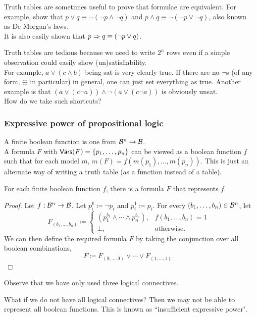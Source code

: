 Truth tables are sometimes useful to prove that formulae are equivalent. For example, show that $p\vee q \equiv \neg(\neg p \wedge \neg q)$ and $p\wedge q \equiv \neg(\neg p \vee \neg q)$, also known as De Morgan's laws.\\
It is also easily shown that $p\Rightarrow q \equiv (\neg p \vee q)$.

Truth tables are tedious because we need to write $2^n$ rows even if a simple observation could easily show (un)satisfiability.\\
For example, $a \vee (c \wedge b)$ being sat is very clearly true. If there are no $\neg$s (of any form, $\oplus$ in particular) in general, one can just set everything as true. Another example is that $(a \vee (c \neg a))\wedge\neg (a \vee (c \neg a))$ is obviously unsat.\\
How do we take such shortcuts?

\subsubsection{Expressive power of propositional logic}

A finite boolean function is one from $\mathcal{B}^n\to\mathcal{B}$.\\
A formula $F$ with $\mathsf{Vars}(F)=\{p_1,\ldots,p_n\}$ can be viewed as a boolean function $f$ such that for each model $m$, $m(F)=f(m(p_1),\ldots,m(p_n))$. This is just an alternate way of writing a truth table (as a function instead of a table).

\begin{theorem}
For each finite boolean function $f$, there is a formula $F$ that represents $f$.
\end{theorem}
\begin{proof}
Let $f:\mathcal{B}^n\to\mathcal{B}$. Let $p_i^0\coloneqq\neg p_i$ and $p_i^1\coloneqq p_i$. For every $(b_1,\ldots,b_n)\in\mathcal{B}^n$, let
\[
	F_{(b_1,\ldots,b_n)} \coloneqq
	\begin{cases}
		(p_1^{b_1}\wedge\cdots\wedge p_n^{b_n}), & f(b_1,\ldots,b_n)=1 \\
		\bot, & \text{otherwise.}
	\end{cases}
\]
We can then define the required formula $F$ by taking the conjunction over all boolean combinations,
\[ F \coloneqq F_{(0,\ldots,0)} \vee \cdots \vee F_{(1,\ldots,1)}. \]
\end{proof}

Observe that we have only used three logical connectives.

What if we do not have all logical connectives? Then we may not be able to represent all boolean functions. This is known as ``insufficient expressive power".\\

